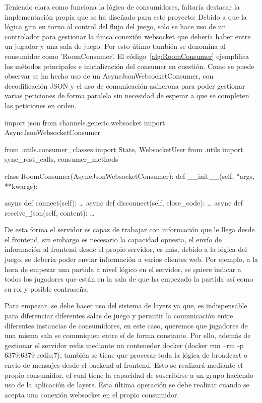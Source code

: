 Teniendo clara como funciona la lógica de consumidores, faltaría destacar la implementación propia que se ha diseñado para este proyecto: Debido a que 
la lógica gira en torno al control del flujo del juego, solo se hace uso de un controlador para gestionar la única conexión websocket que debería haber entre
un jugador y una sala de juego. Por esto útimo también se denomina al consumidor como 'RoomConsumer'. El código~\ref{alg:RoomConsumer} ejemplifica los métodos 
principales e inicialización del consumer en cuestión. Como se puede observar se ha hecho uso de un AsyncJsonWebsocketConsumer, con decodificación JSON y el uso de 
comunicación asíncrona para poder gestionar varias peticiones de forma paralela sin necesidad de esperar a que se completen las peticiones en orden.
\begin{mypython}[float={h},caption={RoomConsumer},label={alg:RoomConsumer}]
	import json
	from channels.generic.websocket import AsyncJsonWebsocketConsumer
																																																	
	from .utils.consumer_classes import State, WebsocketUser
	from .utils import sync_rest_calls, consumer_methods
	
	class RoomConsumer(AsyncJsonWebsocketConsumer):
	def __init__(self, *args, **kwargs):
																																																	
	async def connect(self): \dots																																			
	async def disconnect(self, close_code):	\dots																																			
	async def receive_json(self, content): \dots	
\end{mypython}

De esta forma el servidor es capaz de trabajar con información que le llega desde el frontend, sin embargo es necesario la capacidad opuesta, el envío de información al 
frontend desde el propio servidor, es más, debido a la lógica del juego, se debería poder enviar información a varios clientes web. Por ejemplo, a la hora de empezar una partida
a nivel lógico en el servidor, se quiere indicar a todos los jugadores que están en la sala de que ha empezado la partida así como su rol y posible contraseña.

Para empezar, se debe hacer uso del sistema de layers ya que, es indispensable para diferenciar diferentes salas de juego y permitir 
la comunicación entre diferentes instancias de consumidores, en este caso, queremos que jugadores de una misma sala se comuniquen entre sí de forma constante. 
Por ello, además de gestionar el servidor redis mediante un contenedor docker (docker run --rm -p 6379:6379 redis:7), también se tiene que procesar toda la lógica de broadcast
o envio de mensajes desde el backend al frontend. Esto se realizará mediante el propio consumidor, el cual tiene la capacidad de suscribirse a un grupo haciendo uso
de la aplicación de layers. Esta última operación se debe realizar cuando se acepta una conexión websocket en el propio consumidor. 


